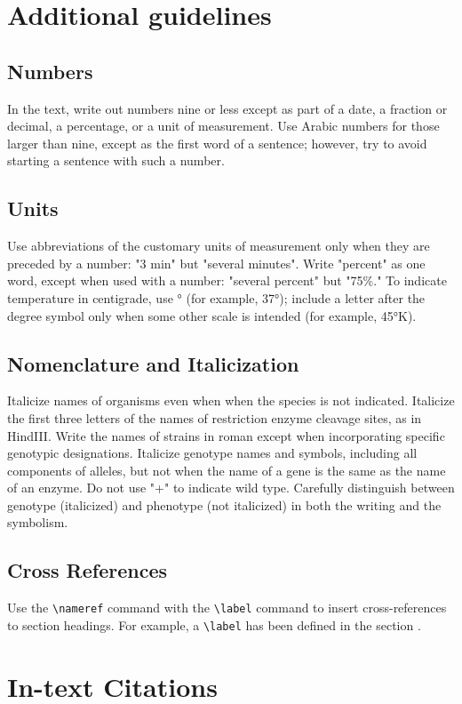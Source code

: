 \documentclass[9pt,twocolumn,twoside]{gsajnl}
\begin{document}
\section{Additional guidelines}

\subsection{Numbers} In the text, write out numbers nine or less except as part of a date, a fraction or decimal, a percentage, or a unit of measurement. Use Arabic numbers for those larger than nine, except as the first word of a sentence; however, try to avoid starting a sentence with such a number.

\subsection{Units} Use abbreviations of the customary units of measurement only when they are preceded by a number: "3 min" but "several minutes". Write "percent" as one word, except when used with a number: "several percent" but "75\%." To indicate temperature in centigrade, use ° (for example, 37°); include a letter after the degree symbol only when some other scale is intended (for example, 45°K).

\subsection{Nomenclature and Italicization} Italicize names of organisms even when  when the species is not indicated.  Italicize the first three letters of the names of restriction enzyme cleavage sites, as in HindIII. Write the names of strains in roman except when incorporating specific genotypic designations. Italicize genotype names and symbols, including all components of alleles, but not when the name of a gene is the same as the name of an enzyme. Do not use "+" to indicate wild type. Carefully distinguish between genotype (italicized) and phenotype (not italicized) in both the writing and the symbolism.

\subsection{Cross References}
Use the \verb|\nameref| command with the \verb|\label| command to insert cross-references to section headings. For example, a \verb|\label| has been defined in the section .

\section{In-text Citations}
\end{document}
